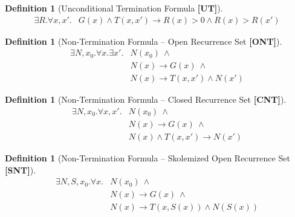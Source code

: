 \documentclass[preprint]{sigplanconf}
\theoremstyle{definition}
\newtheorem{definition}[theorem]{Definition}
\begin{document}
\begin{figure*}
\begin{framed}
\begin{definition}[Unconditional Termination Formula {\bf [UT]}]
\label{def:UT}
\begin{align*}
 \exists R . \forall x, x' . & G(x) \wedge T(x, x') \rightarrow R(x) > 0 \wedge R(x) > R(x')
\end{align*}
\end{definition}

\begin{definition}[Non-Termination Formula -- Open Recurrence Set  {\bf [ONT]}]
\label{def:ont}
 \begin{align*}
  \exists N, x_0 . \forall x . \exists x' . & N(x_0) ~\wedge \\ &  N(x) \rightarrow G(x) ~ \wedge \\
							& N(x) \rightarrow T(x, x') \wedge N(x') 
 \end{align*}
\end{definition}

\begin{definition}[Non-Termination Formula -- Closed Recurrence Set {\bf [CNT]}]
\label{def:cnt}
 \begin{align*}
  \exists N, x_0 . \forall x, x' . & N(x_0) ~ \wedge \\ & N(x) \rightarrow G(x) ~ \wedge \\
							& N(x) \wedge T(x, x') \rightarrow N(x') 
 \end{align*}

\begin{definition}[Non-Termination Formula -- Skolemized Open Recurrence Set  {\bf [SNT]}]
\label{def:snt}
 \begin{align*}
  \exists N, S, x_0 . \forall x . & N(x_0) ~\wedge \\ &  N(x) \rightarrow G(x) ~ \wedge \\
							& N(x) \rightarrow T(x, S(x)) \wedge N(S(x))
 \end{align*}
\end{definition}

\end{definition}


\end{framed}
\end{figure*}
\end{document}
